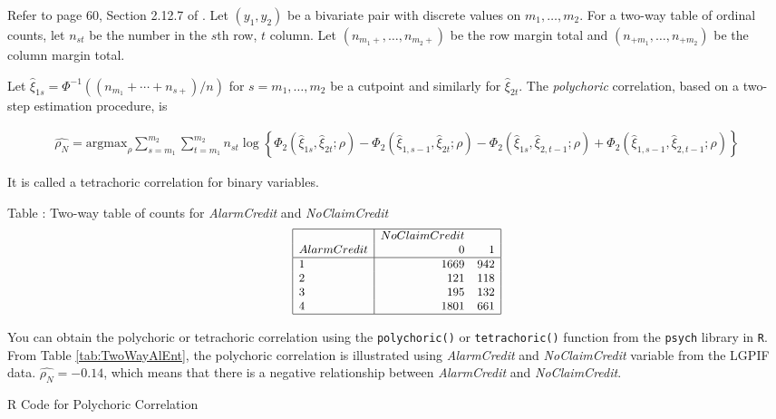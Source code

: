 \documentclass[]{book}
\theoremstyle{definition}
\theoremstyle{definition}
\theoremstyle{definition}
\theoremstyle{remark}
\begin{document}
Refer to page 60, Section 2.12.7 of \citep{joe2014dependence}. Let
\((y_1,y_2)\) be a bivariate pair with discrete values on
\(m_1, \ldots, m_2\). For a two-way table of ordinal counts, let
\(n_{st}\) be the number in the \(s\)th row, \(t\) column. Let
\((n_{m_1+}, \ldots, n_{m_2+})\) be the row margin total and
\((n_{+m_1}, \ldots, n_{+m_2})\) be the column margin total.

Let \(\hat{\xi}_{1s} = \Phi^{-1}((n_{m_1}+\cdots+n_{s+})/n)\) for
\(s=m_1, \ldots, m_2\) be a cutpoint and similarly for
\(\hat{\xi}_{2t}\). The \emph{polychoric} correlation, based on a
two-step estimation procedure, is

\begin{eqnarray*}
\hat{\rho_N} = \text{argmax}_{\rho}
\sum_{s=m_1}^{m_2} \sum_{t=m_1}^{m_2} n_{st} \log\left\{
\Phi_2(\hat{\xi}_{1s}, \hat{\xi}_{2t};\rho)
-\Phi_2(\hat{\xi}_{1,s-1}, \hat{\xi}_{2t};\rho)
-\Phi_2(\hat{\xi}_{1s}, \hat{\xi}_{2,t-1};\rho)
+\Phi_2(\hat{\xi}_{1,s-1}, \hat{\xi}_{2,t-1};\rho)
\right\}
\end{eqnarray*}

It is called a tetrachoric correlation for binary variables.

Table : \label{tab:TwoWayAlEnt} Two-way table of counts for
\emph{AlarmCredit} and \emph{NoClaimCredit} \[
{\small \begin{matrix}
\begin{array}{|l|rr|} 
    \hline
                  & NoClaimCredit &  \\
AlarmCredit & 0     & 1      \\
  \hline
          1  & 1669  &  942   \\
          2  &    121 &  118 \\
          3  &  195  &   132 \\
          4 &  1801  &   661 \\
   \hline
\end{array}
\end{matrix}}
\]

You can obtain the polychoric or tetrachoric correlation using the
\texttt{polychoric()} or \texttt{tetrachoric()} function from the
\texttt{psych} library in \texttt{R}. From Table \ref{tab:TwoWayAlEnt},
the polychoric correlation is illustrated using \emph{AlarmCredit} and
\emph{NoClaimCredit} variable from the LGPIF data.
\(\hat{\rho_N}=-0.14\), which means that there is a negative
relationship between \emph{AlarmCredit} and \emph{NoClaimCredit}.

R Code for Polychoric Correlation
\end{document}
